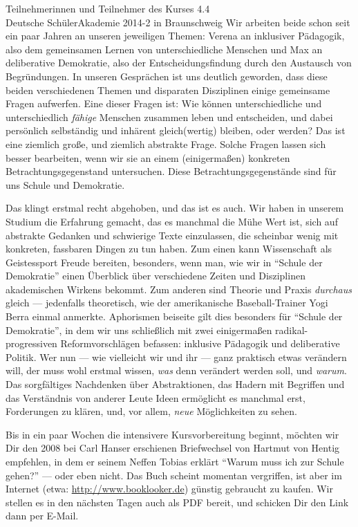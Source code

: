 \documentclass[a4paper]{letter}
\begin{document}
\begin{letter}{
	Teilnehmerinnen und Teilnehmer des Kurses 4.4 \\
	Deutsche SchülerAkademie 2014-2 in Braunschweig}
Wir arbeiten beide schon seit ein paar Jahren an unseren jeweiligen Themen: Verena an inklusiver Pädagogik, also dem gemeinsamen Lernen von unterschiedliche Menschen und Max an deliberative Demokratie, also der Entscheidungsfindung durch den Austausch von Begründungen.
In unseren Gesprächen ist uns deutlich geworden, dass diese beiden verschiedenen Themen und disparaten Disziplinen einige gemeinsame Fragen aufwerfen.
Eine dieser Fragen ist:
Wie können unterschiedliche und unterschiedlich \emph{fähige} Menschen zusammen leben und entscheiden, und dabei persönlich selbständig und inhärent gleich(wertig) bleiben, oder werden?
Das ist eine ziemlich große, und ziemlich abstrakte Frage.
Solche Fragen lassen sich besser bearbeiten, wenn wir sie an einem (einigermaßen) konkreten Betrachtungsgegenstand untersuchen.
Diese Betrachtungsgegenstände sind für uns Schule und Demokratie.

Das klingt erstmal recht abgehoben, und das ist es auch.
Wir haben in unserem Studium die Erfahrung gemacht, das es manchmal die Mühe Wert ist, sich auf abstrakte Gedanken und schwierige Texte einzulassen, die scheinbar wenig mit konkreten, fassbaren Dingen zu tun haben.
Zum einen kann Wissenschaft als Geistessport Freude bereiten, besonders, wenn man, wie wir in ``Schule der Demokratie'' einen Überblick über verschiedene Zeiten und Disziplinen akademischen Wirkens bekommt.
Zum anderen sind Theorie und Praxis \emph{durchaus} gleich --- jedenfalls theoretisch, wie der amerikanische Baseball-Trainer Yogi Berra einmal anmerkte.
Aphorismen beiseite gilt dies besonders für ``Schule der Demokratie'', in dem wir uns schließlich mit zwei einigermaßen radikal-progressiven Reformvorschlägen befassen: inklusive Pädagogik und deliberative Politik.
Wer nun --- wie vielleicht wir und ihr --- ganz praktisch etwas verändern will, der muss wohl erstmal wissen, \emph{was} denn verändert werden soll, und \emph{warum}.
Das sorgfältiges Nachdenken über Abstraktionen, das Hadern mit Begriffen und das Verständnis von anderer Leute Ideen ermöglicht es manchmal erst, Forderungen zu klären, und, vor allem, \emph{neue} Möglichkeiten zu sehen.

Bis in ein paar Wochen die intensivere Kursvorbereitung beginnt, möchten wir Dir den 2008 bei Carl Hanser erschienen Briefwechsel von Hartmut von Hentig empfehlen, in dem er seinem Neffen Tobias erklärt ``Warum muss ich zur Schule gehen?'' --- oder eben nicht.
Das Buch scheint momentan vergriffen, ist aber im Internet (etwa: \url{http://www.booklooker.de}) günstig gebraucht zu kaufen.
Wir stellen es in den nächsten Tagen auch als PDF bereit, und schicken Dir den Link dann per E-Mail.


\end{letter}
\end{document}
